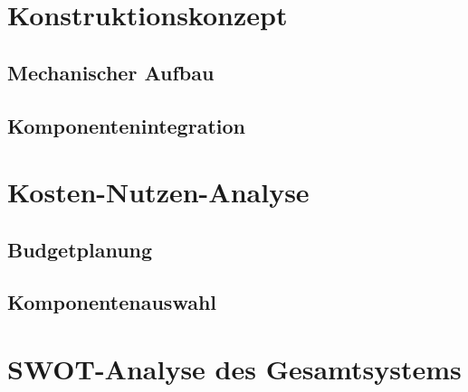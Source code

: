 \section{Konstruktionskonzept}
\subsection{Mechanischer Aufbau}
\subsection{Komponentenintegration}

\section{Kosten-Nutzen-Analyse}
\subsection{Budgetplanung}
\subsection{Komponentenauswahl}

\section{SWOT-Analyse des Gesamtsystems}











